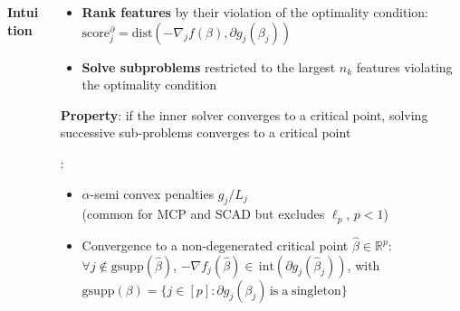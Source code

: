 \documentclass[english,final,t]{beamer}
\newcommand{\bbR}{\mathbb{R}}
\begin{document}
\begin{frame}{}
\begin{columns}[t]
\begin{column}{.3\linewidth}
\begin{block}{\textbf{\color{malgared} Intuition}}
	\end{block}
\end{column}
\begin{column}{.3\linewidth}
	\begin{block}{\textbf{\color{malgared}{\# 1 Features Priorization}}}
		\begin{itemize}
			\item
			\textbf{Rank features} by their violation of the optimality condition:
			  $\mathrm{score}^\partial_j = \mathrm{dist}(-\nabla_j f (\beta), \partial g_j (\beta_j))$
			\item \textbf{Solve subproblems} restricted to the largest $n_k$ features violating the optimality condition
		\end{itemize}
		\textbf{\color{malgared}Property}: if the inner solver converges to a critical point, solving successive sub-problems converges to a critical point
		\end{block}
	\begin{block}{\textbf{\color{malgared}{\# 2 Support Identification}}}
		{\color{malgared}{Assumptions}}:
		\begin{itemize}
			\item
			$\alpha$-semi convex penalties $g_j / L_j$
			\\
			(common for MCP and SCAD but excludes $\ell_p$, $p<1$)
			\item
			Convergence to a non-degenerated critical point $\hat \beta \in \bbR^p$:\\
			 $\forall j \notin \mathrm{gsupp}(\hat \beta)$,
			$- \nabla f_j (\hat \beta) \in \, \mathrm{int}(\partial g_j(\hat \beta_j))$, with
			$\mathrm{gsupp}(\beta) = \{j \in [p]: \partial g_j(\beta_j) \, \mathrm{is \; a \; singleton}\}$
		\end{itemize}


\end{block}
\end{column}
\end{columns}
\end{frame}
\end{document}
